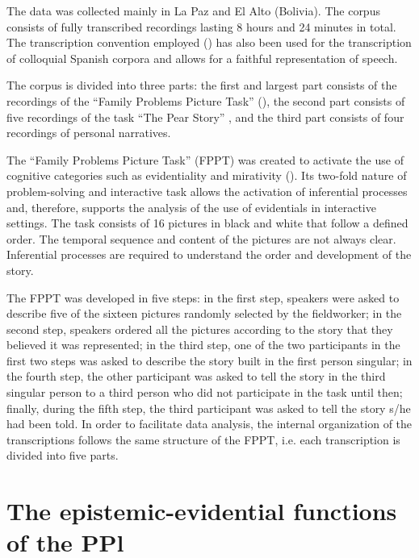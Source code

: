 \documentclass[output=paper]{langsci/langscibook}
\begin{document}
The data was collected mainly in La Paz and El Alto (Bolivia). The corpus consists of fully transcribed recordings lasting 8 hours and 24 minutes in total. The transcription convention employed (\citealt{Briz2000}) has also been used for the transcription of colloquial Spanish corpora and allows for a faithful representation of speech. 

The corpus is divided into three parts: the first and largest part consists of the recordings of the “Family Problems Picture Task” (\citealt{SanRoqueetal2012}), the second part consists of five recordings of the task “The Pear Story” \citep{Chafe1980}, and the third part consists of four recordings of personal narratives.

The “Family Problems Picture Task” (FPPT) was created to activate the use of cognitive categories such as evidentiality and mirativity (\citealt[140]{SanRoqueetal2012}). Its two-fold nature of problem-solving and interactive task allows the activation of inferential processes and, therefore, supports the analysis of the use of evidentials in interactive settings. The task consists of 16 pictures in black and white that follow a defined order. The temporal sequence and content of the pictures are not always clear. Inferential processes are required to understand the order and development of the story. 

The FPPT was developed in five steps: in the first step, speakers were asked to describe five of the sixteen pictures randomly selected by the fieldworker; in the second step, speakers ordered all the pictures according to the story that they believed it was represented; in the third step, one of the two participants in the first two steps was asked to describe the story built in the first person singular; in the fourth step, the other participant was asked to tell the story in the third singular person to a third person who did not participate in the task until then; finally, during the fifth step, the third participant was asked to tell the story s/he had been told. In order to facilitate data analysis, the internal organization of the transcriptions follows the same structure of the FPPT, i.e. each transcription is divided into five parts. 

\section{The epistemic-evidential functions of the PPl}\label{s:gq4}
\end{document}
